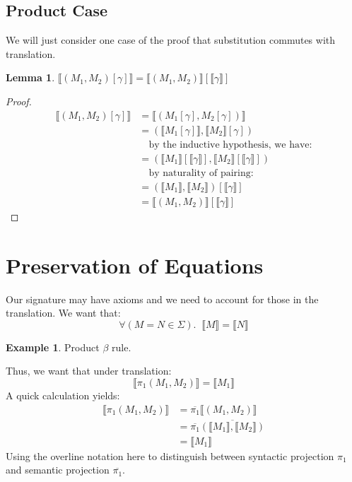 \documentclass[12pt]{article}
\theoremstyle{definition}
\newtheorem{lemma}{Lemma}[section]
\newtheorem{example}{Example}[section]
\newcommand{\den}[1]{\llbracket #1 \rrbracket}
\begin{document}
\subsection{Product Case}
We will just consider one case of the proof that substitution commutes with translation.
\begin{lemma}
    $\den{(M_1,M_2)[\gamma]} = \den{(M_1,M_2)}[\den{\gamma}]$
\end{lemma}
\begin{proof}

\begin{align*}
    \den{(M_1, M_2)[\gamma]} &= \den{(M_1[\gamma],M_2[\gamma])}\\
    &= (\den{M_1[\gamma]},\den{M_2}[\gamma])\\
    & \quad \text{by the inductive hypothesis, we have:}\\
    &= (\den{M_1}[\den{\gamma}],\den{M_2}[\den{\gamma}])\\
    & \quad \text{by naturality of pairing:}\\
    &= (\den{M_1},\den{M_2})[\den{\gamma}]\\
    &= \den{(M_1,M_2)}[\den{\gamma}]
\end{align*}
\end{proof}

\section{Preservation of Equations}
Our signature may have axioms and we need to account for those in the translation. We want that:
\[
  \forall (M = N \in \Sigma).\;\; \den{M} = \den{N}  
\]
\begin{example} 
    Product $\beta$ rule. 
    \begin{prooftree}
    \end{prooftree}
\end{example}
Thus, we want that under translation: 
\[
  \den{\pi_1(M_1,M_2)} = \den{M_1}  
\]
A quick calculation yields: 
\begin{align*} 
    \den{\pi_1(M_1,M_2)} &= \overline{\pi_1}\den{(M_1,M_2)}\\
    &= \overline{\pi_1}\overline{(\den{M_1},\den{M_2})}\\
    &= \den{M_1}
\end{align*}
Using the overline notation here to distinguish between syntactic projection $\pi_1$ and semantic projection $\overline{\pi_1}$.
\end{document}
